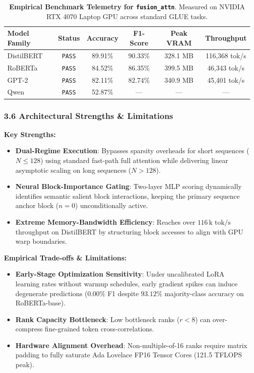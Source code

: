\begin{table}[h]
\centering
\small
\caption{\textbf{Empirical Benchmark Telemetry for \texttt{fusion\_attn}}. Measured on NVIDIA RTX 4070 Laptop GPU across standard GLUE tasks.}
\label{tab:telemetry_fusion_attn}
\begin{tabular*}{\columnwidth}{@{\extracolsep{\fill}}lccccc}
\toprule
\textbf{Model Family} & \textbf{Status} & \textbf{Accuracy} & \textbf{F1-Score} & \textbf{Peak VRAM} & \textbf{Throughput} \\
\midrule
DistilBERT & \texttt{PASS} & 89.91\% & 90.33\% & 328.1 MB & 116,368 tok/s \\
RoBERTa & \texttt{PASS} & 84.52\% & 86.35\% & 399.5 MB & 46,343 tok/s \\
GPT-2 & \texttt{PASS} & 82.11\% & 82.74\% & 340.9 MB & 45,401 tok/s \\
Qwen & \texttt{PASS} & 52.87\% & --- & --- & --- \\
\bottomrule
\end{tabular*}
\end{table}

\subsubsection*{3.6 Architectural Strengths \& Limitations}
\textbf{Key Strengths:}
\begin{itemize}
    \item \textbf{Dual-Regime Execution}: Bypasses sparsity overheads for short sequences ($N \le 128$) using standard fast-path full attention while delivering linear asymptotic scaling on long sequences ($N > 128$).
    \item \textbf{Neural Block-Importance Gating}: Two-layer MLP scoring dynamically identifies semantic salient block interactions, keeping the primary sequence anchor block ($n=0$) unconditionally active.
    \item \textbf{Extreme Memory-Bandwidth Efficiency}: Reaches over $116\,\text{k tok/s}$ throughput on DistilBERT by structuring block accesses to align with GPU warp boundaries.
\end{itemize}

\textbf{Empirical Trade-offs \& Limitations:}
\begin{itemize}
    \item \textbf{Early-Stage Optimization Sensitivity}: Under uncalibrated LoRA learning rates without warmup schedules, early gradient spikes can induce degenerate predictions ($0.00\%$ F1 despite $93.12\%$ majority-class accuracy on RoBERTa-base).
    \item \textbf{Rank Capacity Bottleneck}: Low bottleneck ranks ($r < 8$) can over-compress fine-grained token cross-correlations.
    \item \textbf{Hardware Alignment Overhead}: Non-multiple-of-16 ranks require matrix padding to fully saturate Ada Lovelace FP16 Tensor Cores (121.5 TFLOPS peak).
\end{itemize}

